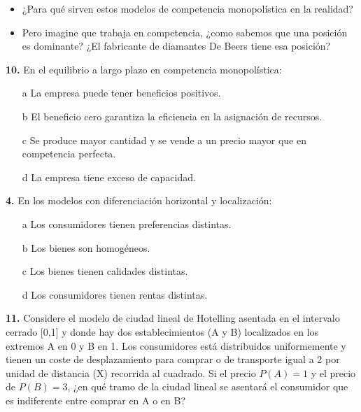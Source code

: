 \documentclass{nuevotema}
\begin{document}
\conceptos

\preguntas


\begin{itemize}
    \item ¿Para qué sirven estos modelos de competencia monopolística en la realidad?
    
    \item Pero imagine que trabaja en competencia, ¿como sabemos que una posición es dominante? ¿El fabricante de diamantes De Beers tiene esa posición?
\end{itemize}


\textbf{10.} En el equilibrio a largo plazo en competencia monopolística:

\begin{itemize}
	\item[a] La empresa puede tener beneficios positivos.
	\item[b] El beneficio cero garantiza la eficiencia en la asignación de recursos.
	\item[c] Se produce mayor cantidad y se vende a un precio mayor que en competencia perfecta.
	\item[d] La empresa tiene exceso de capacidad.
\end{itemize}


\textbf{4.} En los modelos con diferenciación horizontal y localización: 

\begin{itemize}
	\item[a] Los consumidores tienen preferencias distintas.
	\item[b] Los bienes son homogéneos.
	\item[c] Los bienes tienen calidades distintas.
	\item[d] Los consumidores tienen rentas distintas.
\end{itemize}

\textbf{11.} Considere el modelo de ciudad lineal de Hotelling asentada en el intervalo cerrado [0,1] y donde hay dos establecimientos (A y B) localizados en los extremos A en 0 y B en 1. Los consumidores está distribuidos uniformemente y tienen un coste de desplazamiento para comprar o de transporte igual a 2 por unidad de distancia (X) recorrida al cuadrado.
Si el precio $P(A)=1$ y el precio de $P(B)=3$, ¿en qué tramo de la ciudad lineal se asentará el consumidor que es indiferente entre comprar en A o en B?
\end{document}
